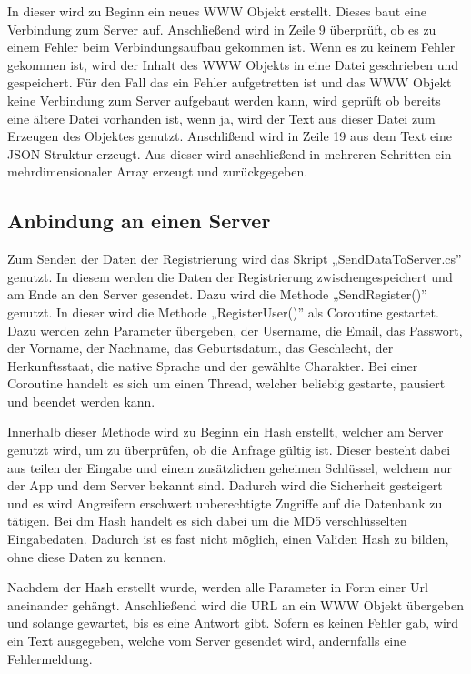 				In dieser wird zu Beginn ein neues WWW Objekt erstellt. Dieses baut eine Verbindung zum Server auf. Anschließend wird in Zeile 9 überprüft, ob es zu einem Fehler beim Verbindungsaufbau gekommen ist. Wenn es zu keinem Fehler gekommen ist, wird der Inhalt des WWW Objekts in eine Datei geschrieben und gespeichert. Für den Fall das ein Fehler aufgetretten ist und das WWW Objekt keine Verbindung zum Server aufgebaut werden kann, wird geprüft ob bereits eine ältere Datei vorhanden ist, wenn ja, wird der Text aus dieser Datei zum Erzeugen des Objektes genutzt. Anschlißend wird in Zeile 19 aus dem Text eine \ac{JSON} Struktur erzeugt. Aus dieser wird anschließend in mehreren Schritten ein mehrdimensionaler Array erzeugt und zurückgegeben.

		\subsection{Anbindung an einen Server}
			Zum Senden der Daten der Registrierung wird das Skript „SendDataToServer.cs” genutzt. In diesem werden die Daten der Registrierung zwischengespeichert und am Ende an den Server gesendet. Dazu wird die Methode „SendRegister()” genutzt. In dieser wird die Methode „RegisterUser()” als Coroutine gestartet. Dazu werden zehn Parameter übergeben, der Username, die Email, das Passwort, der Vorname, der Nachname, das Geburtsdatum, das Geschlecht, der Herkunftsstaat, die native Sprache und der gewählte Charakter. Bei einer Coroutine handelt es sich um einen Thread, welcher beliebig gestarte, pausiert und beendet werden kann.

			Innerhalb dieser Methode wird zu Beginn ein Hash erstellt, welcher am Server genutzt wird, um zu überprüfen, ob die Anfrage gültig ist. Dieser besteht dabei aus teilen der Eingabe und einem zusätzlichen geheimen Schlüssel, welchem nur der App und dem Server bekannt sind. Dadurch wird die Sicherheit gesteigert und es wird Angreifern erschwert unberechtigte Zugriffe auf die Datenbank zu tätigen. Bei dm Hash handelt es sich dabei um die MD5 verschlüsselten Eingabedaten. Dadurch ist es fast nicht möglich, einen Validen Hash zu bilden, ohne diese Daten zu kennen.

			Nachdem der Hash erstellt wurde, werden alle Parameter in Form einer Url aneinander gehängt. Anschließend wird die URL an ein WWW Objekt übergeben und solange gewartet, bis es eine Antwort gibt. Sofern es keinen Fehler gab, wird ein Text ausgegeben, welche vom Server gesendet wird, andernfalls eine Fehlermeldung.


